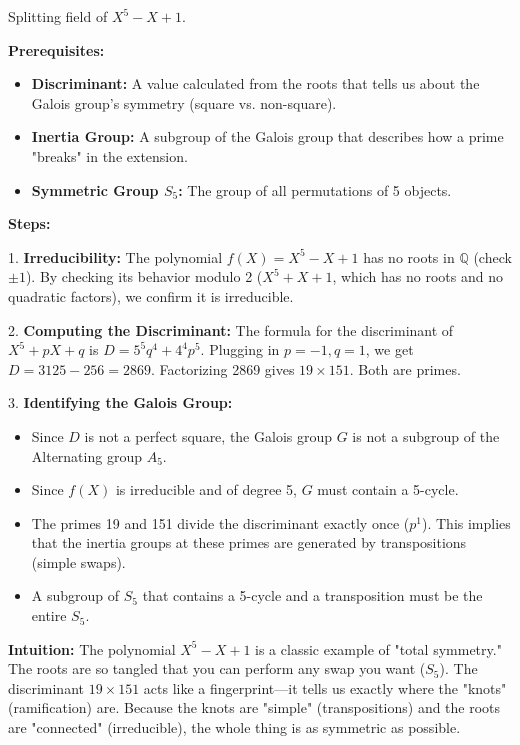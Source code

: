 \begin{exercise}
\label{algebra:2025:5}
Splitting field of $X^5 - X + 1$.
\end{exercise}

\begin{solution}
\textbf{Prerequisites:}
\begin{itemize}
    \item \textbf{Discriminant:} A value calculated from the roots that tells us about the Galois group's symmetry (square vs. non-square).
    \item \textbf{Inertia Group:} A subgroup of the Galois group that describes how a prime "breaks" in the extension.
    \item \textbf{Symmetric Group $S_5$:} The group of all permutations of 5 objects.
\end{itemize}

\textbf{Steps:}

1. \textbf{Irreducibility:} The polynomial $f(X) = X^5 - X + 1$ has no roots in $\mathbb{Q}$ (check $\pm 1$). By checking its behavior modulo 2 ($X^5 + X + 1$, which has no roots and no quadratic factors), we confirm it is irreducible.

2. \textbf{Computing the Discriminant:} The formula for the discriminant of $X^5 + pX + q$ is $D = 5^5 q^4 + 4^4 p^5$. Plugging in $p = -1, q = 1$, we get $D = 3125 - 256 = 2869$. Factorizing 2869 gives $19 \times 151$. Both are primes.

3. \textbf{Identifying the Galois Group:} 
    \begin{itemize}
        \item Since $D$ is not a perfect square, the Galois group $G$ is not a subgroup of the Alternating group $A_5$.
        \item Since $f(X)$ is irreducible and of degree 5, $G$ must contain a 5-cycle.
        \item The primes 19 and 151 divide the discriminant exactly once ($p^1$). This implies that the inertia groups at these primes are generated by transpositions (simple swaps).
        \item A subgroup of $S_5$ that contains a 5-cycle and a transposition must be the entire $S_5$.
    \end{itemize}

\textbf{Intuition:}
The polynomial $X^5 - X + 1$ is a classic example of "total symmetry." The roots are so tangled that you can perform any swap you want ($S_5$). The discriminant $19 \times 151$ acts like a fingerprint—it tells us exactly where the "knots" (ramification) are. Because the knots are "simple" (transpositions) and the roots are "connected" (irreducible), the whole thing is as symmetric as possible.

\end{solution}
